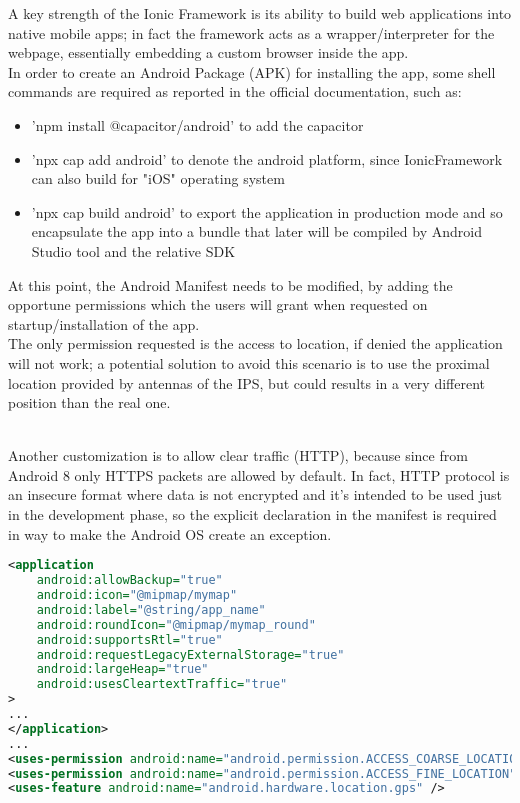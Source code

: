 \documentclass[conference]{IEEEtran}
\begin{document}
A key strength of the Ionic Framework is its ability to build web applications into native mobile apps; in fact the framework acts as a wrapper/interpreter for the webpage, essentially embedding a custom browser inside the app.
\\
In order to create an Android Package (APK) for installing the app, some shell commands are required as reported in the official documentation, such as:
\begin{itemize}
    \item 'npm install @capacitor/android' to add the capacitor
    \item  'npx cap add android' to denote the android platform, since IonicFramework can also build for "iOS" operating system
    \item 'npx cap build android' to export the application in production mode and so encapsulate the app into a bundle that later will be compiled by Android Studio\cite{b11} tool and the relative SDK 
\end{itemize}


At this point, the Android Manifest needs to be modified, by adding the opportune permissions which the users will grant when requested on startup/installation of the app.
\\
The only permission requested is the access to location, if denied the application will not work; a potential solution to avoid this scenario is to use the proximal location provided by antennas of the IPS, but could results in a very different position than the real one.

\\
Another customization is to allow clear traffic (HTTP), because since from Android 8 only HTTPS packets are allowed by default.
In fact, HTTP protocol is an insecure format where data is not encrypted and it's intended to be used just in the development phase, so the explicit declaration in the manifest is required in way to make the Android OS create an exception.

\begin{lstlisting}[language=XML, caption=Snippet of Android Manifest]
<application
    android:allowBackup="true"
    android:icon="@mipmap/mymap"
    android:label="@string/app_name"
    android:roundIcon="@mipmap/mymap_round"
    android:supportsRtl="true"
    android:requestLegacyExternalStorage="true"
    android:largeHeap="true"
    android:usesCleartextTraffic="true"
>
...
</application>
...
<uses-permission android:name="android.permission.ACCESS_COARSE_LOCATION" />
<uses-permission android:name="android.permission.ACCESS_FINE_LOCATION" />
<uses-feature android:name="android.hardware.location.gps" />
        
\end{lstlisting}
\end{document}
